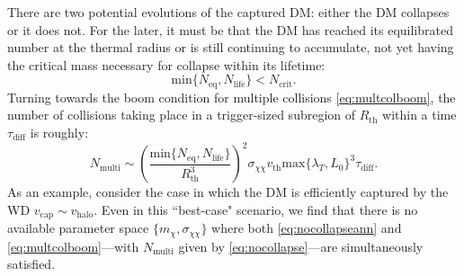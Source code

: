 \documentclass[preprintnumbers,amsmath,amssymb,prd,superscriptaddress]{revtex4}
\def\r{\right)}
\def\l{\left(}
\begin{document}
There are two potential evolutions of the captured DM: either the DM collapses or it does not. 
For the later, it must be that the DM has reached its equilibrated number at the thermal radius or is still continuing to accumulate, not yet having the critical mass necessary for collapse within its lifetime:
\begin{equation}
\label{eq:nocollapseann}
\text{min}\{N_\text{eq}, N_\text{life}\} < N_\text{crit}.
\end{equation}
Turning towards the boom condition for multiple collisions \eqref{eq:multcolboom}, the number of collisions taking place in a trigger-sized subregion of $R_\text{th}$ within a time $\tau_\text{diff}$ is roughly:
\begin{equation}
\label{eq:nocollapse}
N_\text{multi} \sim \l \frac{\text{min}\{N_\text{eq}, N_\text{life}\}}{R_\text{th}^3} \r^2 \sigma_{\chi \chi} v_\text{th} \text{max}\{\lambda_T,L_0\}^3 \tau_\text{diff}. 
\end{equation}
As an example, consider the case in which the DM is efficiently captured by the WD $v_\text{cap} \sim v_\text{halo}$. 
Even in this ``best-case" scenario, we find that there is no available parameter space $\{m_\chi, \sigma_{\chi \chi}\}$ where both \eqref{eq:nocollapseann} and \eqref{eq:multcolboom}---with $N_\text{multi}$ given by \eqref{eq:nocollapse}---are simultaneously satisfied. 
\end{document}
